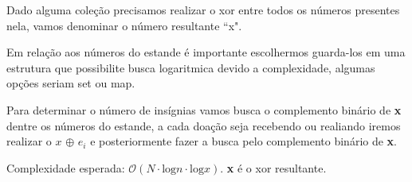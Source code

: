 Dado alguma coleção precisamos realizar o xor entre todos os números presentes nela, vamos denominar o número resultante ``x".

Em relação aos números do estande é importante escolhermos guarda-los em uma estrutura que possibilite busca logaritmica devido a complexidade, algumas opções seriam set ou map.

Para determinar o número de insígnias vamos busca o complemento binário de \textbf{x} dentre os números do estande, a cada doação seja recebendo ou realiando iremos realizar o $x$ $\oplus$ $e_i$ e posteriormente fazer a busca pelo complemento binário de \textbf{x}.

Complexidade esperada: $\mathcal{O}(N\cdot \text{log}n\cdot \text{log}x)$. \textbf{x} é o xor resultante.
